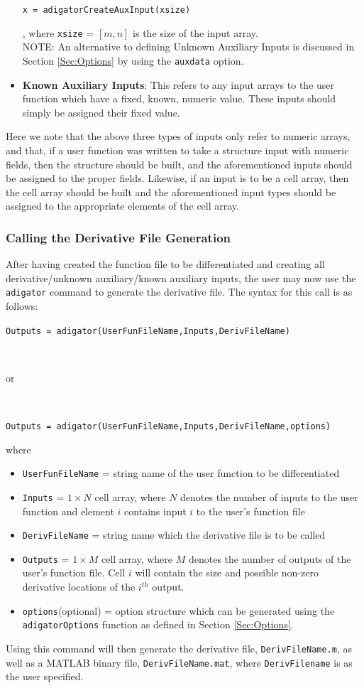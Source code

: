 \documentclass[10pt,pdftex]{article}
\begin{document}
\begin{itemize}
\centerline{\texttt{x = adigatorCreateAuxInput(xsize)}},
where \texttt{xsize} = $[m,n]$ is the size of the input array. \\
NOTE: An alternative to defining Unknown Auxiliary Inputs is discussed in Section \ref{Sec:Options} by using the \texttt{auxdata} option.
\item {\bf Known Auxiliary Inputs}: This refers to any input arrays to the user function which have a fixed, known, numeric value. These inputs should simply be assigned their fixed value.
\end{itemize}
Here we note that the above three types of inputs only refer to numeric arrays, and that, if a user function was written to take a structure input with numeric fields, then the structure should be built, and the aforementioned inputs should be assigned to the proper fields. Likewise, if an input is to be a cell array, then the cell array should be built and the aforementioned input types should be assigned to the appropriate elements of the cell array.
\subsubsection{Calling the Derivative File Generation}
After having created the function file to be differentiated and creating all derivative/unknown auxiliary/known auxiliary inputs, the user may now use the \texttt{adigator} command to generate the derivative file. The syntax for this call is as follows:\\
\centerline{\texttt{Outputs = adigator(UserFunFileName,Inputs,DerivFileName)}}\\
\centerline{or}\\
\centerline{\texttt{Outputs = adigator(UserFunFileName,Inputs,DerivFileName,options)}}
where
\begin{itemize}
\item \texttt{UserFunFileName} = string name of the user function to be differentiated
\item \texttt{Inputs} = $1 \times N$ cell array, where $N$ denotes the number of inputs to the user function and element $i$ contains input $i$ to the user's function file
\item \texttt{DerivFileName} = string name which the derivative file is to be called
\item \texttt{Outputs} = $1 \times M$ cell array, where $M$ denotes the number of outputs of the user's function file. Cell $i$ will contain the size and possible non-zero derivative locations of the $i^{th}$ output.
\item \texttt{options}(optional) = option structure which can be generated using the \texttt{adigatorOptions} function as defined in Section \ref{Sec:Options}.
\end{itemize}
Using this command will then generate the derivative file, \texttt{DerivFileName.m}, as well as a MATLAB binary file, \texttt{DerivFileName.mat}, where \texttt{DerivFilename} is as the user specified.
\end{document}
